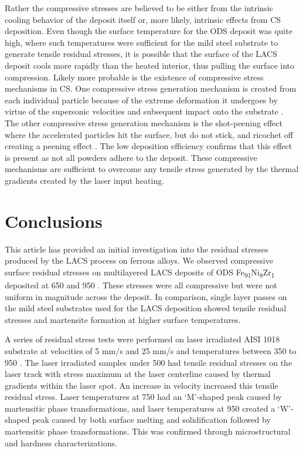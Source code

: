 		
		Rather the compressive stresses are believed to be either from the intrinsic cooling behavior of the deposit itself or, more likely, intrinsic effects from CS deposition. Even though the surface temperature for the ODS deposit was quite high, where such temperatures were sufficient for the mild steel substrate to generate tensile residual stresses, it is possible that the surface of the LACS deposit cools more rapidly than the heated interior, thus pulling the surface into compression. Likely more probable is the existence of compressive stress mechanisms in CS. One compressive stress generation mechanism is created from each individual particle because of the extreme deformation it undergoes by virtue of the supersonic velocities and subsequent impact onto the substrate \cite{RN560,RN1404}. The other compressive stress generation mechanism is the shot-peening effect where the accelerated particles hit the surface, but do not stick, and ricochet off creating a peening effect \cite{RN1404}. The low deposition efficiency confirms that this effect is present as not all powders adhere to the deposit. These compressive mechanisms are sufficient to overcome any tensile stress generated by the thermal gradients created by the laser input heating.

\section*{Conclusions}


	This article has provided an initial investigation into the residual stresses produced by the LACS process on ferrous alloys. We observed compressive surface residual stresses on multilayered LACS deposits of ODS Fe\textsubscript{91}Ni\textsubscript{8}Zr\textsubscript{1} deposited at 650 \celsius{} and 950 \celsius{}. These stresses were all compressive but were not uniform in magnitude across the deposit. In comparison, single layer passes on the mild steel substrates used for the LACS deposition showed tensile residual stresses and martensite formation at higher surface temperatures.
	
	
	
	A series of residual stress tests were performed on laser irradiated AISI 1018 substrate at velocities of 5 mm/s and 25 mm/s and temperatures between 350 \celsius{} to 950 \celsius{}. The laser irradiated samples under 500 \celsius{} had tensile residual stresses on the laser track with stress maximum at the laser centerline caused by thermal gradients within the laser spot. An increase in velocity increased this tensile residual stress. Laser temperatures at 750 \celsius{} had an ‘M’-shaped peak caused by martensitic phase transformations, and laser temperatures at 950 \celsius{} created a ‘W’-shaped peak caused by both surface melting and solidification followed by martensitic phase transformations. This was confirmed through microstructural and hardness characterizations.
	
